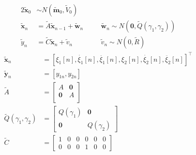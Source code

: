 \begin{frame}
\begin{columns}[T]
      \scriptsize
      \vspace{-1em} %
      \begin{alignat*}{2}
          \tilde{\mathbf{x}}_0 & \sim N(\tilde{\mathbf{m}}_0, \tilde{V}_0) &&\\
          \tilde{\mathbf{x}}_n &= \tilde{A}\tilde{\mathbf{x}}_{n-1} +
          \tilde{\mathbf{w}}_n && \quad \tilde{\mathbf{w}}_n\sim N(\mathbf{0},\tilde{Q}(\gamma_1,\gamma_2))\\
          \tilde{y}_n &= \tilde{C}\tilde{\mathbf{x}}_{n} + \tilde{v}_n && \quad \tilde{v}_n\sim N(0, \tilde{R})
      \end{alignat*}
      \vspace{-0.8em}
      \begin{align*}
        \tilde{\mathbf{x}}_n&=\left[\xi_1[n],\dot{\xi_1}[n],\ddot{\xi_1}[n],\xi_2[n],\dot{\xi_2}[n],\ddot{\xi_2}[n]\right]^\intercal\\[2pt]
        \tilde{\mathbf{y}}_n&=\left[y_{1n}, y_{2n}\right]\\[8pt]
        \tilde{A}&=\begin{bmatrix}
            A & \mathbf{0}\\
            \mathbf{0} & A\\
        \end{bmatrix}\\[12pt]
        \tilde{Q}(\gamma_1,\gamma_2)&=\begin{bmatrix}
              Q(\gamma_1) & \mathbf{0}\\
              \mathbf{0} & Q(\gamma_2)
        \end{bmatrix}\\[4pt]
        \tilde{C}&=\begin{bmatrix}
            1 & 0 & 0 & 0 & 0 & 0\\
            0 & 0 & 0 & 1 & 0 & 0
        \end{bmatrix}
      \end{align*}
	  \normalsize 
  \end{columns}
\end{frame}

